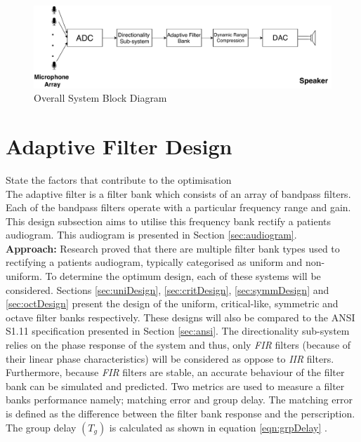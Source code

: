 \documentclass[12pt, onecolumn]{article}
\begin{document}
\begin{figure}[h]
\centering
\includegraphics[width=0.9\linewidth]{system.pdf}
\caption{Overall System Block Diagram}
\label{fig:system}
\end{figure}  

\section{Adaptive Filter Design}

State the factors that contribute to the optimisation\\
\noindent The adaptive filter is a filter bank which consists of an array of bandpass filters. Each of the bandpass filters operate with a particular frequency range and gain. This design subsection aims to utilise this frequency bank rectify a patients audiogram. This audiogram is presented in Section \ref{sec:audiogram}.\\

\noindent \textbf{Approach:} Research proved that there are multiple filter bank types used to rectifying a patients audiogram, typically categorised as uniform and non-uniform. To determine the optimum design, each of these systems will be considered. Sections \ref{sec:uniDesign}, \ref{sec:critDesign}, \ref{sec:symmDesign} and \ref{sec:octDesign} present the design of the uniform, critical-like, symmetric and octave filter banks respectively. These designs will also be compared to the ANSI S1.11 specification presented in Section \ref{sec:ansi}. The directionality sub-system relies on the phase response of the system and thus, only \textit{FIR} filters (because of their linear phase characteristics) will be considered as oppose to \textit{IIR} filters. Furthermore, because \textit{FIR} filters are stable, an accurate behaviour of the filter bank can be simulated and predicted. Two metrics are used to measure a filter banks performance namely; matching error and group delay. The matching error is defined as the difference between the filter bank response and the perscription. The group delay $(T_g)$ is calculated as shown in equation \ref{eqn:grpDelay} \cite{chang}.
\end{document}
